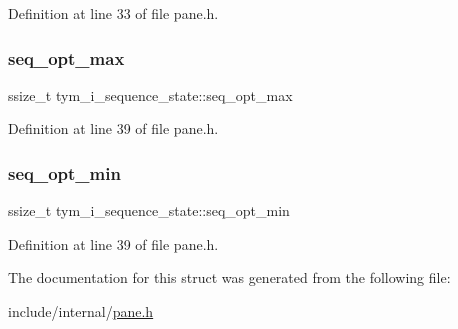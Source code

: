 Definition at line 33 of file pane.\+h.

\mbox{\label{structtym__i__sequence__state_a8e140f08f16bf4d54a5bbcf03bf6b00d}} 
\subsubsection{\texorpdfstring{seq\+\_\+opt\+\_\+max}{seq\_opt\_max}}
{\footnotesize\ttfamily ssize\+\_\+t tym\+\_\+i\+\_\+sequence\+\_\+state\+::seq\+\_\+opt\+\_\+max}



Definition at line 39 of file pane.\+h.

\mbox{\label{structtym__i__sequence__state_a67bf9d70d6fd7bdf6b67f1a704d2f7dc}} 
\subsubsection{\texorpdfstring{seq\+\_\+opt\+\_\+min}{seq\_opt\_min}}
{\footnotesize\ttfamily ssize\+\_\+t tym\+\_\+i\+\_\+sequence\+\_\+state\+::seq\+\_\+opt\+\_\+min}



Definition at line 39 of file pane.\+h.



The documentation for this struct was generated from the following file\+:\begin{DoxyCompactItemize}
\item 
include/internal/\hyperlink{pane_8h}{pane.\+h}\end{DoxyCompactItemize}
